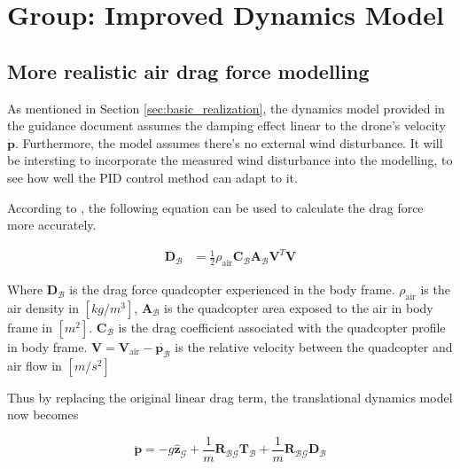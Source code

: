 \documentclass[12pt]{article}
\begin{document}
\section{Group: Improved Dynamics Model}

\subsection{More realistic air drag force modelling}
As mentioned in Section \ref{sec:basic_realization}, the dynamics model provided in the guidance document assumes the damping effect
linear to the drone's velocity $\dot{\mathbf{p}}$.
Furthermore, the model assumes there's no external wind disturbance. It will be intersting to incorporate
the measured wind disturbance into the modelling, to see how well the PID control method can adapt to it.

According to \cite{cano_quadrotor_nodate}, the following equation can be used to calculate the drag force more accurately.

\begin{align}
    \label{eq:wind_drag_model}
    \mathbf{D}_\mathcal{B} & = \frac{1}{2}\rho_\text{air}\mathbf{C}_\mathcal{B}\mathbf{A}_\mathcal{B}\mathbf{V}^T\mathbf{V}
\end{align}

Where $\mathbf{D}_\mathcal{B}$ is the drag force quadcopter experienced in the body frame. $\rho_\text{air}$ is the air density in $[kg/m^3]$, $\mathbf{A}_\mathcal{B}$ is the quadcopter area exposed to the air in body frame in $[m^2]$.
$\mathbf{C}_\mathcal{B}$ is the drag coefficient associated with the quadcopter profile in body frame.
$\mathbf{V} = \mathbf{V}_\text{air} - \dot{\mathbf{p}_\mathcal{B}}$ is the relative velocity between the quadcopter and air flow in $[m/s^2]$

Thus by replacing the original linear drag term, the translational dynamics model now becomes

\begin{equation}
    \ddot{\mathbf{p}} = -g\hat{\mathbf{z}}_{\mathcal{G}} + \frac{1}{m}\mathbf{R}_{\mathcal{BG}}\mathbf{T}_\mathcal{B} + \frac{1}{m}\mathbf{R}_{\mathcal{BG}}\mathbf{D}_\mathcal{B}
\end{equation}
\end{document}
